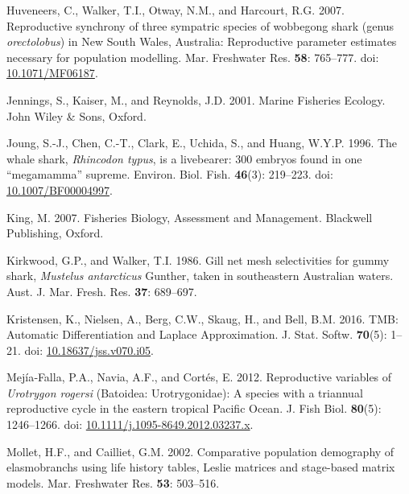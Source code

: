 \documentclass[
]{article}
\newenvironment{CSLReferences}%
  {}%
  {\par}
\begin{document}
\begin{CSLReferences}{1}{0}
Huveneers, C., Walker, T.I., Otway, N.M., and Harcourt, R.G. 2007. Reproductive synchrony of three sympatric species of wobbegong shark (genus \emph{orectolobus}) in {New} {South} {Wales}, {Australia}: Reproductive parameter estimates necessary for population modelling. Mar. Freshwater Res. \textbf{58}: 765--777. doi: \href{https://doi.org/10.1071/MF06187}{10.1071/MF06187}.

Jennings, S., Kaiser, M., and Reynolds, J.D. 2001. Marine {Fisheries} {Ecology}. John Wiley \& Sons, Oxford.

Joung, S.-J., Chen, C.-T., Clark, E., Uchida, S., and Huang, W.Y.P. 1996. The whale shark, \emph{{Rhincodon} typus}, is a livebearer: 300 embryos found in one {``megamamma''} supreme. Environ. Biol. Fish. \textbf{46}(3): 219--223. doi: \href{https://doi.org/10.1007/BF00004997}{10.1007/BF00004997}.

King, M. 2007. Fisheries {Biology}, {Assessment} and {Management}. Blackwell Publishing, Oxford.

Kirkwood, G.P., and Walker, T.I. 1986. Gill net mesh selectivities for gummy shark, \emph{{Mustelus} antarcticus} {Gunther}, taken in southeastern {Australian} waters. Aust. J. Mar. Fresh. Res. \textbf{37}: 689--697.

Kristensen, K., Nielsen, A., Berg, C.W., Skaug, H., and Bell, B.M. 2016. {TMB}: {Automatic} {Differentiation} and {Laplace} {Approximation}. J. Stat. Softw. \textbf{70}(5): 1--21. doi: \href{https://doi.org/10.18637/jss.v070.i05}{10.18637/jss.v070.i05}.

Mejía‐Falla, P.A., Navia, A.F., and Cortés, E. 2012. Reproductive variables of \emph{{Urotrygon} rogersi} ({Batoidea}: {Urotrygonidae}): A species with a triannual reproductive cycle in the eastern tropical {Pacific} {Ocean}. J. Fish Biol. \textbf{80}(5): 1246--1266. doi: \href{https://doi.org/10.1111/j.1095-8649.2012.03237.x}{10.1111/j.1095-8649.2012.03237.x}.

Mollet, H.F., and Cailliet, G.M. 2002. Comparative population demography of elasmobranchs using life history tables, {Leslie} matrices and stage-based matrix models. Mar. Freshwater Res. \textbf{53}: 503--516.


\end{CSLReferences}
\end{document}
